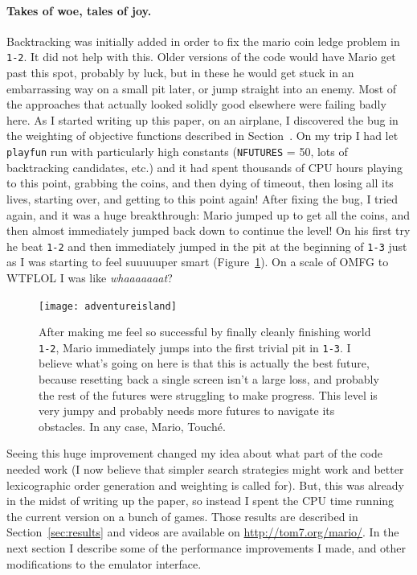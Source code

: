 \documentclass[twocolumn]{article}
\begin{document}
\paragraph{Takes of woe, tales of joy.} 
Backtracking was initially added in order to fix the mario coin ledge
problem in {\tt 1-2}. It did not help with this. Older versions of the
code would have Mario get past this spot, probably by luck, but in
these he would get stuck in an embarrassing way on a small pit later,
or jump straight into an enemy. Most of the approaches that actually
looked solidly good elsewhere were failing badly here. As I started
writing up this paper, on an airplane, I discovered the bug in the
weighting of objective functions described in
Section~\label{sec:objectiveweighting}. On my trip I had let {\tt
  playfun} run with particularly high constants ({\tt NFUTURES} = 50,
lots of backtracking candidates, etc.) and it had spent thousands of
CPU hours playing to this point, grabbing the coins, and then dying of
timeout, then losing all its lives, starting over, and getting to this
point again! After fixing the bug, I tried again, and it was a huge
breakthrough: Mario jumped up to get all the coins, and then almost
immediately jumped back down to continue the level! On his first try
he beat {\tt 1-2} and then immediately jumped in the pit at the
beginning of {\tt 1-3} just as I was starting to feel suuuuuper smart
(Figure~\ref{fig:mario13}). On a scale of OMFG to WTFLOL I was like
{\em whaaaaaaat}?

\begin{figure}[ht]
\begin{center}
\texttt{[image: adventureisland]}
\end{center}\vspace{-0.1in}
\caption{After making me feel so successful by finally cleanly
  finishing world {\tt 1-2}, Mario immediately jumps into the first
  trivial pit in {\tt 1-3}. I believe what's going on here is that
  this is actually the best future, because resetting back a single
  screen isn't a large loss, and probably the rest of the futures were
  struggling to make progress. This level is very jumpy and probably
  needs more futures to navigate its obstacles. In any case, Mario,
  Touch\'e.}
\label{fig:mario13}
\end{figure}

Seeing this huge improvement changed my idea about what part of the
code needed work (I now believe that simpler search strategies might
work and better lexicographic order generation and weighting is called
for). But, this was already in the midst of writing up the paper, so
instead I spent the CPU time running the current version on a bunch of
games. Those results are described in Section~\ref{sec:results} and
videos are available on \url{http://tom7.org/mario/}. In the next
section I describe some of the performance improvements I made, and
other modifications to the emulator interface.
\end{document}
